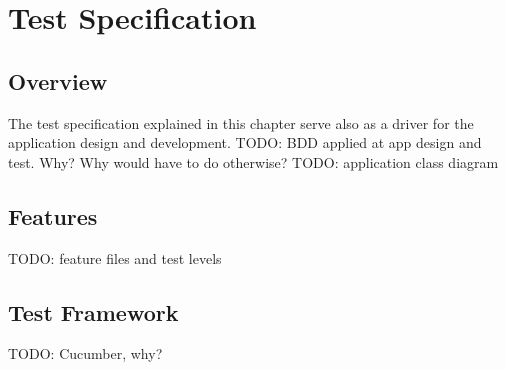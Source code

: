 
\chapter{Test Specification} %

\label{Chapter3} %




\section{Overview}
The test specification explained in this chapter serve also as a driver for the application design and development. 
TODO: BDD applied at app design and test. Why? Why would have to do otherwise?
TODO: application class diagram


\section{Features}
TODO: feature files and test levels



\section{Test Framework}
TODO: Cucumber, why?
